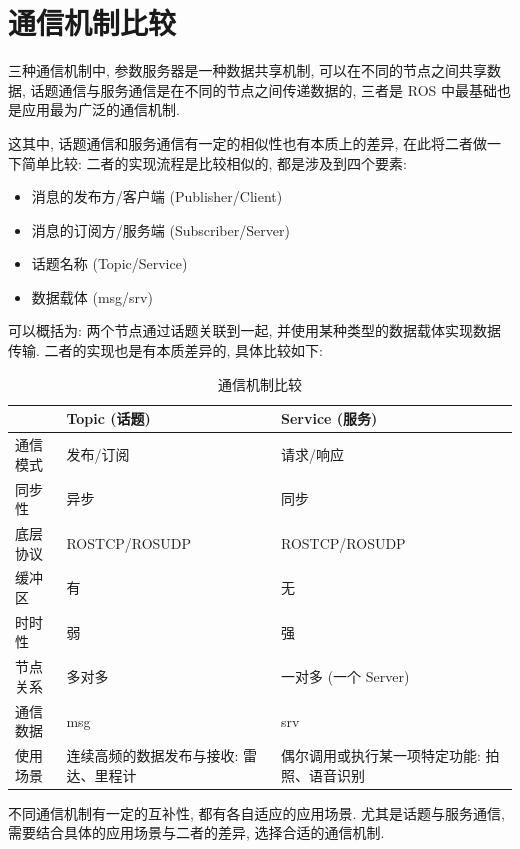 \documentclass[openany, fontset=windowsold]{ctexbook}
\theoremstyle{kaiti}
\theoremstyle{normal}
\begin{document}
\section{通信机制比较}

三种通信机制中, 参数服务器是一种数据共享机制, 可以在不同的节点之间共享数据, 话题通信与服务通信是在不同的节点之间传递数据的, 三者是 ROS 中最基础也是应用最为广泛的通信机制.

这其中, 话题通信和服务通信有一定的相似性也有本质上的差异, 在此将二者做一下简单比较: 二者的实现流程是比较相似的, 都是涉及到四个要素:

\begin{itemize}
  \item 消息的发布方/客户端 (Publisher/Client)
  \item 消息的订阅方/服务端 (Subscriber/Server)
  \item 话题名称 (Topic/Service)
  \item 数据载体 (msg/srv)
\end{itemize}

可以概括为: 两个节点通过话题关联到一起, 并使用某种类型的数据载体实现数据传输. 二者的实现也是有本质差异的, 具体比较如下:

\begin{table}[!ht]
  \centering
  \caption{通信机制比较}
  \label{tab:communication_mechanism_comparison}
  \begin{tabular}{lp{4cm}p{4.5cm}}
    \hline
    & Topic (话题)  &	Service (服务) \\
    \hline
    通信模式 & 发布/订阅 	      & 请求/响应 \\
    同步性 	 & 异步 	          & 同步 \\
    底层协议 & ROSTCP/ROSUDP 	  & ROSTCP/ROSUDP \\
    缓冲区 	 & 有 	            & 无 \\
    时时性 	 & 弱 	            & 强 \\
    节点关系 & 多对多 	        &   一对多 (一个 Server) \\
    通信数据 & msg 	            &   srv \\
    使用场景 & 连续高频的数据发布与接收: 雷达、里程计 &	偶尔调用或执行某一项特定功能: 拍照、语音识别 \\
    \hline
  \end{tabular}
\end{table}

不同通信机制有一定的互补性, 都有各自适应的应用场景. 尤其是话题与服务通信, 需要结合具体的应用场景与二者的差异, 选择合适的通信机制.
\end{document}
